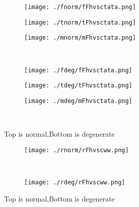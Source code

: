\documentclass[aps,floats,floatfix,nofootinbib]{revtex4-1}
\begin{document}
\begin{center}
\begin{figure}
\begin{subfigure}{0.3\textwidth}
\texttt{[image: ./fnorm/fFhvsctata.png]}
\label{}
\end{subfigure}
\begin{subfigure}{0.3\textwidth}
\texttt{[image: ./tnorm/tFhvsctata.png]}
\label{}
\end{subfigure}
\begin{subfigure}{0.3\textwidth}
\texttt{[image: ./mnorm/mFhvsctata.png]}
\label{}
\end{subfigure}\\
\begin{subfigure}{0.3\textwidth}
\texttt{[image: ./fdeg/fFhvsctata.png]}
\label{}
\end{subfigure}
\begin{subfigure}{0.3\textwidth}
\texttt{[image: ./tdeg/tFhvsctata.png]}
\label{}
\end{subfigure}
\begin{subfigure}{0.3\textwidth}
\texttt{[image: ./mdeg/mFhvsctata.png]}
\label{}
\end{subfigure}\\
\caption{Top is normal,Bottom is degenerate}
\end{figure}
\end{center}

\begin{center}
\begin{figure}
\begin{subfigure}{0.95\textwidth}
\texttt{[image: ./rnorm/rFhvscww.png]}
\label{}
\end{subfigure}\\
\begin{subfigure}{0.95\textwidth}
\texttt{[image: ./rdeg/rFhvscww.png]}
\label{}
\end{subfigure}
\caption{Top is normal,Bottom is degenerate}
\end{figure}
\end{center}
\end{document}
